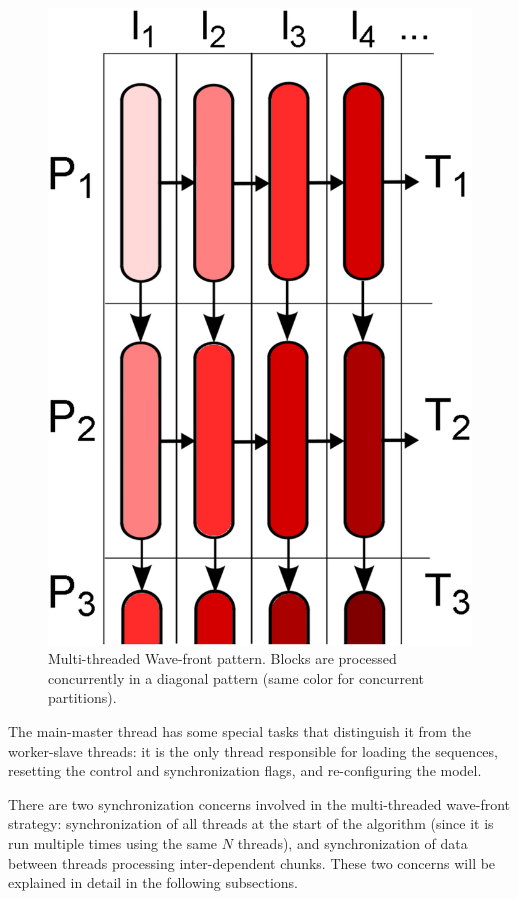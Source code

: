 \begin{figure}
	\includegraphics[width=1.0\linewidth]{img-par/wave-front-model.eps}
	\caption[Multi-threaded Wave-front pattern] {Multi-threaded Wave-front pattern. Blocks are processed concurrently in a diagonal pattern (same color for concurrent partitions). }
	\label{wave-front-model}
\end{figure}

The main-master thread has some special tasks that distinguish it from the worker-slave threads: it is the only thread responsible for loading the sequences, resetting the control and synchronization flags, and re-configuring the model.

There are two synchronization concerns involved in the multi-threaded wave-front strategy: synchronization of all threads at the start of the algorithm (since it is run multiple times using the same $N$ threads), and synchronization of data between threads processing inter-dependent chunks. These two concerns will be explained in detail in the following subsections.


